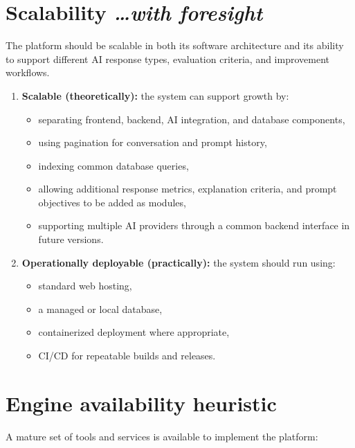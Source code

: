 \documentclass[11pt,a4paper]{article}
\newcommand{\BvrHint}[1]{%
  {\normalfont\normalsize\itshape\hfill #1}}
\begin{document}
\section{Scalability%
  \BvrHint{\ldots with foresight}}

The platform should be scalable in both its software architecture and its
ability to support different AI response types, evaluation criteria, and
improvement workflows.

\begin{enumerate}[leftmargin=0.7cm]
    \item \textbf{Scalable (theoretically):} the system can support growth by:
    \begin{itemize}[leftmargin=0.7cm]
        \item separating frontend, backend, AI integration, and database
        components,
        \item using pagination for conversation and prompt history,
        \item indexing common database queries,
        \item allowing additional response metrics, explanation criteria,
        and prompt objectives to be added as modules,
        \item supporting multiple AI providers through a common backend
        interface in future versions.
    \end{itemize}

    \item \textbf{Operationally deployable (practically):} the system should
    run using:
    \begin{itemize}[leftmargin=0.7cm]
        \item standard web hosting,
        \item a managed or local database,
        \item containerized deployment where appropriate,
        \item CI/CD for repeatable builds and releases.
    \end{itemize}
\end{enumerate}

\section{Engine availability heuristic}

A mature set of tools and services is available to implement the platform:
\end{document}
